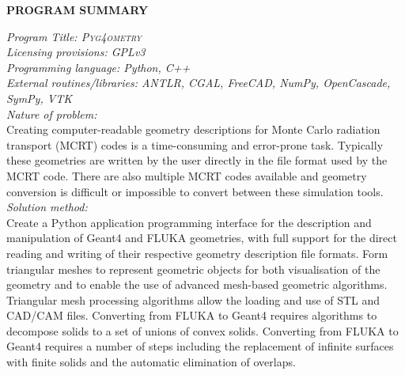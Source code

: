 \documentclass[preprint,12pt]{elsarticle}
\newcommand{\PYGEOMETRY}{\textsc{Pyg4ometry}}
\begin{document}



{\noindent \bf PROGRAM SUMMARY}

\begin{small}
\noindent
{\em Program Title: \PYGEOMETRY{} }                                         		\\
{\em Licensing provisions: GPLv3 }							\\
{\em Programming language: Python, C++}                         		\\
{\em External routines/libraries: ANTLR, CGAL, FreeCAD, NumPy, OpenCascade, SymPy, VTK} \\
{\em Nature of problem:}\\  %
Creating computer-readable geometry descriptions for Monte Carlo radiation transport (MCRT) codes is a time-consuming and error-prone task.
Typically these geometries are written by the user directly in the file format used by the MCRT code. There are also multiple MCRT codes
available and geometry conversion is difficult or impossible to convert between these simulation tools.
\\
{\em Solution method:}\\  %
Create a Python application programming interface for the description and manipulation of Geant4 and FLUKA geometries, with full support for
the direct reading and writing of their respective geometry description file formats.
Form triangular meshes to represent geometric objects for both visualisation of the
geometry and to enable the use of advanced mesh-based geometric algorithms. Triangular mesh processing algorithms allow the loading and use of STL and CAD/CAM
files. Converting from FLUKA to Geant4 requires algorithms to decompose solids to a set of unions of convex solids. Converting from
FLUKA to Geant4 requires a number of steps including the replacement of infinite surfaces with finite solids and the automatic elimination of overlaps.


\end{small}
\end{document}
